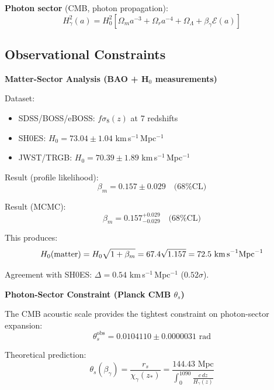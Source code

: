 \documentclass[twocolumn,superscriptaddress,prl,amsmath,amssymb]{revtex4-2}
\begin{document}
\textbf{Photon sector} (CMB, photon propagation):
\begin{equation}
H^2_\gamma(a) = H_0^2[\Omega_m a^{-3} + \Omega_r a^{-4} + \Omega_\Lambda + \beta_\gamma \mathcal{E}(a)]
\end{equation}

\subsection{Observational Constraints}

\textbf{Matter-Sector Analysis (BAO + H$_0$ measurements)}

Dataset:
\begin{itemize}
\item SDSS/BOSS/eBOSS: $f\sigma_8(z)$ at 7 redshifts~\cite{Alam2021}
\item SH0ES: $H_0 = 73.04 \pm 1.04$ km\,s$^{-1}$\,Mpc$^{-1}$~\cite{Riess2022}
\item JWST/TRGB: $H_0 = 70.39 \pm 1.89$ km\,s$^{-1}$\,Mpc$^{-1}$~\cite{Freedman2024}
\end{itemize}

Result (profile likelihood):
\begin{equation}
\beta_m = 0.157 \pm 0.029 \quad \text{(68\% CL)}
\end{equation}

Result (MCMC):
\begin{equation}
\beta_m = 0.157^{+0.029}_{-0.029} \quad \text{(68\% CL)}
\end{equation}

This produces:
\begin{equation}
H_0(\text{matter}) = H_0 \sqrt{1 + \beta_m} = 67.4\sqrt{1.157} = 72.5 \text{ km\,s}^{-1}\text{Mpc}^{-1}
\end{equation}

Agreement with SH0ES: $\Delta = 0.54$ km\,s$^{-1}$\,Mpc$^{-1}$ ($0.52\sigma$).

\textbf{Photon-Sector Constraint (Planck CMB $\theta_s$)}

The CMB acoustic scale provides the tightest constraint on photon-sector expansion:
\begin{equation}
\theta_s^{\text{obs}} = 0.0104110 \pm 0.0000031 \text{ rad}
\end{equation}

Theoretical prediction:
\begin{equation}
\theta_s(\beta_\gamma) = \frac{r_s}{\chi_\gamma(z_*)} = \frac{144.43 \text{ Mpc}}{\int_0^{1090} \frac{c\,dz}{H_\gamma(z)}}
\end{equation}
\end{document}
